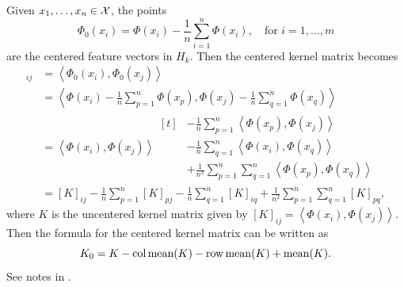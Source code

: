 Given \(x_1, \dots, x_n \in \mathcal{X}\), the points
\begin{equation}
    \label{eqn:centered-features}
    \Phi_0(x_i) = \Phi(x_i) - \frac{1}{n} \sum_{i=1}^{n} \Phi(x_i), \quad \text{for \(i = 1,\dots,m\)}
\end{equation}
are the centered feature vectors in \(H_k\).
Then the centered kernel matrix becomes
\def\ipt#1{\left\langle #1 \right\rangle}
\begin{align*}
    [K_0]_{ij}
    &= \ipt{\Phi_0(x_i), \Phi_0(x_j)}\\
    &= \ipt{\Phi(x_i) - \frac{1}{n} \sum_{p=1}^{n} \Phi(x_p), \Phi(x_j) - \frac{1}{n} \sum_{q=1}^{n} \Phi(x_q)}\\
    &= \ipt{\Phi(x_i), \Phi(x_j)}
    \begin{aligned}[t]
        &- \frac{1}{n} \sum_{p=1}^{n} \ipt{\Phi(x_p), \Phi(x_j)}\\
        &- \frac{1}{n} \sum_{q=1}^{n} \ipt{\Phi(x_i), \Phi(x_q)}\\
        &+ \frac{1}{n^2} \sum_{p=1}^{n} \sum_{q=1}^{n} \ipt{\Phi(x_p), \Phi(x_q)}
    \end{aligned}\\
    &= [K]_{ij} - \frac{1}{n} \sum_{p=1}^{n} [K]_{pj} - \frac{1}{n} \sum_{q=1}^{n} [K]_{iq} + \frac{1}{n^2} \sum_{p=1}^{n} \sum_{q=1}^{n} [K]_{pq},
\end{align*}
where \(K\) is the uncentered kernel matrix given by \([K]_{ij} = \ipt{\Phi(x_i), \Phi(x_j)}\).
Then the formula for the centered kernel matrix can be written as
\begin{equation}
    \label{eqn:centered-kernel-matrix}
    K_0 = K - \operatorname{col\,mean}(K) - \operatorname{row\,mean}(K) + \operatorname{mean}(K).
\end{equation}
See notes in .

